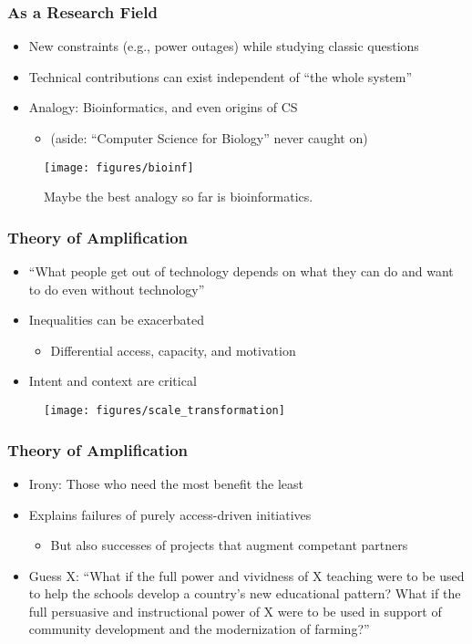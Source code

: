 \documentclass[10pt,mathserif]{beamer}
\begin{document}
\begin{frame}
  \frametitle{As a Research Field}
  \begin{itemize}
  \item New constraints (e.g., power outages) while studying classic questions
  \item Technical contributions can exist independent of ``the whole system''
  \item Analogy: Bioinformatics, and even origins of CS
    \begin{itemize}
    \item (aside: ``Computer Science for Biology'' never caught on)
    \end{itemize}
  \end{itemize}
\begin{figure}[ht]
  \centering
  \texttt{[image: figures/bioinf]}
  \caption{Maybe the best analogy so far is bioinformatics. \label{fig:label} }
\end{figure}
\end{frame}

\begin{frame}
  \frametitle{Theory of Amplification}
  \begin{itemize}
  \item ``What people get out of technology depends on what they can do and want
    to do even without technology''
  \item Inequalities can be exacerbated
    \begin{itemize}
    \item Differential access, capacity, and motivation
    \end{itemize}
  \item Intent and context are critical
  \end{itemize}
\begin{figure}[ht]
  \centering
  \texttt{[image: figures/scale\_transformation]}
\end{figure}

\end{frame}

\begin{frame}
  \frametitle{Theory of Amplification}
  \begin{itemize}
  \item Irony: Those who need the most benefit the least
  \item Explains failures of purely access-driven initiatives
    \begin{itemize}
    \item But also successes of projects that augment competant partners
    \end{itemize}
  \item Guess X: ``What if the full power and vividness of X teaching were to be
    used to help the schools develop a country's new educational pattern? What
    if the full persuasive and instructional power of X were to be used in
    support of community development and the modernization of farming?''
  \end{itemize}
\end{frame}
\end{document}
